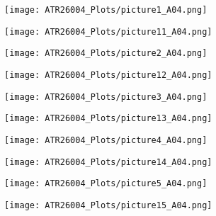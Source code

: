 \begin{figure}[H]
	\centering
	\begin{subfigure}[b]{0.45\textwidth}
		\texttt{[image: ATR26004\_Plots/picture1\_A04.png]}
	\end{subfigure}
	\hfill
	\begin{subfigure}[b]{0.45\textwidth}
		\texttt{[image: ATR26004\_Plots/picture11\_A04.png]}
	\end{subfigure}
\end{figure}

\begin{figure}[H]
	\centering
	\begin{subfigure}[b]{0.45\textwidth}
		\texttt{[image: ATR26004\_Plots/picture2\_A04.png]}
	\end{subfigure}
	\hfill
	\begin{subfigure}[b]{0.45\textwidth}
		\texttt{[image: ATR26004\_Plots/picture12\_A04.png]}
	\end{subfigure}
\end{figure}

\begin{figure}[H]
	\centering
	\begin{subfigure}[b]{0.45\textwidth}
		\texttt{[image: ATR26004\_Plots/picture3\_A04.png]}
	\end{subfigure}
	\hfill
	\begin{subfigure}[b]{0.45\textwidth}
		\texttt{[image: ATR26004\_Plots/picture13\_A04.png]}
	\end{subfigure}
\end{figure}

\begin{figure}[H]
	\centering
	\begin{subfigure}[b]{0.45\textwidth}
		\texttt{[image: ATR26004\_Plots/picture4\_A04.png]}
	\end{subfigure}
	\hfill
	\begin{subfigure}[b]{0.45\textwidth}
		\texttt{[image: ATR26004\_Plots/picture14\_A04.png]}
	\end{subfigure}
\end{figure}

\begin{figure}[H]
	\centering
	\begin{subfigure}[b]{0.45\textwidth}
		\texttt{[image: ATR26004\_Plots/picture5\_A04.png]}
	\end{subfigure}
	\hfill
	\begin{subfigure}[b]{0.45\textwidth}
		\texttt{[image: ATR26004\_Plots/picture15\_A04.png]}
	\end{subfigure}
\end{figure}

